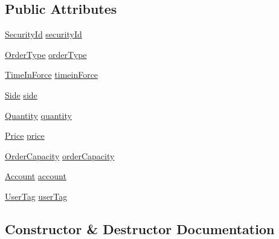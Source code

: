 \subsection*{Public Attributes}
\begin{DoxyCompactItemize}
\item 
\hyperlink{namespaceMetal_1_1Aquis_a822c1f3c19e277e264ba31d810cadbea}{Security\+Id} \hyperlink{classMetal_1_1Aquis_1_1OrderAdd_a52d6147f00cb5093553e2371e0889128}{security\+Id}
\item 
\hyperlink{namespaceMetal_1_1Aquis_aedaac80110efc9b37a08e697501250ba}{Order\+Type} \hyperlink{classMetal_1_1Aquis_1_1OrderAdd_a1b9869d70224141118898b0892282e43}{order\+Type}
\item 
\hyperlink{namespaceMetal_1_1Aquis_afb13b4ac40f6f0b4f0085bfd9572b42d}{Time\+In\+Force} \hyperlink{classMetal_1_1Aquis_1_1OrderAdd_aee9ffdefdcf5f575c2c1228627e89430}{timein\+Force}
\item 
\hyperlink{namespaceMetal_1_1Aquis_ae45bfb9f528bd35d5f31d9ba1b9eafcf}{Side} \hyperlink{classMetal_1_1Aquis_1_1OrderAdd_a434dd763ee773caacf674f03ff4d54d8}{side}
\item 
\hyperlink{namespaceMetal_1_1Aquis_aa25d3bf823ec854f4e93eee2c5f0b529}{Quantity} \hyperlink{classMetal_1_1Aquis_1_1OrderAdd_a2643463679c661d8dab941c3f2bf40fe}{quantity}
\item 
\hyperlink{namespaceMetal_1_1Aquis_a83ca009113cb4fca87827adfee66bcbd}{Price} \hyperlink{classMetal_1_1Aquis_1_1OrderAdd_afe71fd701739a64aaf3c0ed52fe4fcb3}{price}
\item 
\hyperlink{namespaceMetal_1_1Aquis_ac8ffebbdb8def9d93b29ba3fc6878e09}{Order\+Capacity} \hyperlink{classMetal_1_1Aquis_1_1OrderAdd_a6d33517e78c0d5aa0959cc0ef75aaeb0}{order\+Capacity}
\item 
\hyperlink{namespaceMetal_1_1Aquis_acbe82ae737d4c087f18f1af8aabd1d26}{Account} \hyperlink{classMetal_1_1Aquis_1_1OrderAdd_a9c0c3b2e0c4aa5c96b84a9d7bddd980a}{account}
\item 
\hyperlink{namespaceMetal_1_1Aquis_a9e7c42d4dce76e920bc18eb66b799cf4}{User\+Tag} \hyperlink{classMetal_1_1Aquis_1_1OrderAdd_ac81fd314fe475edf236c36f47764cc72}{user\+Tag}
\end{DoxyCompactItemize}


\subsection{Constructor \& Destructor Documentation}
\hypertarget{classMetal_1_1Aquis_1_1OrderAdd_a019321c8f9ec0df43faabeb55f7eb0e3}{}

